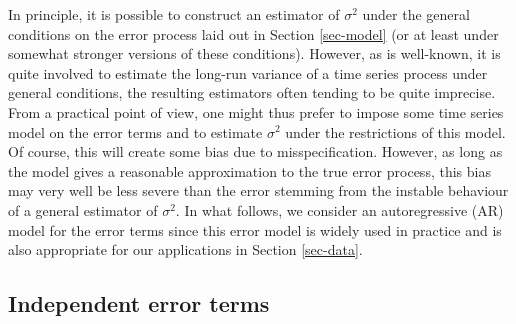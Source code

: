\enlargethispage{0.2cm}
In principle, it is possible to construct an estimator of $\sigma^2$ under the general conditions on the error process laid out in Section \ref{sec-model} (or at least under somewhat stronger versions of these conditions). However, as is well-known, it is quite involved to estimate the long-run variance of a time series process under general conditions, the resulting estimators often tending to be quite imprecise. From a practical point of view, one might thus prefer to impose some time series model on the error terms and to estimate $\sigma^2$ under the restrictions of this model. Of course, this will create some bias due to misspecification. However, as long as the model gives a reasonable approximation to the true error process, this bias may very well be less severe than the error stemming from the instable behaviour of a general estimator of $\sigma^2$. In what follows, we consider an autoregressive (AR) model for the error terms since this error model is widely used in practice and is also appropriate for our applications in Section \ref{sec-data}. 




\subsection{Independent error terms}\label{subsec-error-var-iid} 


